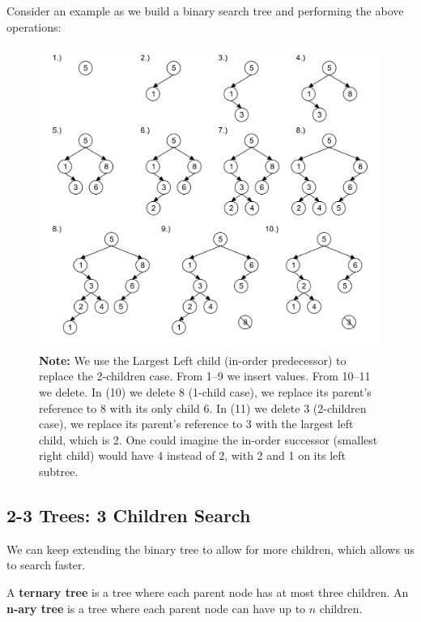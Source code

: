 \newpage 

\noindent
Consider an example as we build a binary search tree and performing the above operations:
\begin{figure}[h]
    \centering
    \includegraphics[width=\textwidth]{./Sections/graphs/search/bst_ex.png}
    \caption{%
        \textbf{Note:} We use the Largest Left child (in-order predecessor) to replace the 2-children case. From 
        1--9 we insert values. From 10--11 we delete. In (10) we delete 8 (1-child case), we replace its 
        parent's reference to 8 with its only child 6. In (11) we delete 3 (2-children case), we replace its parent's reference to 3 with the largest left child, which is 2.
        One could imagine the in-order successor (smallest right child) would have 4 instead of 2, with 2 and 1 on its left subtree.}
    \label{fig:bst_operations}
\end{figure}

\newpage 
\subsection{2-3 Trees: 3 Children Search}

\noindent
We can keep extending the binary tree to allow for more children, which allows us to search faster.
\begin{Def}

    A \textbf{ternary tree} is a tree where each parent node has at most three children. An \textbf{n-ary tree} is a tree where each parent node can have up to $n$ children.
\end{Def}

